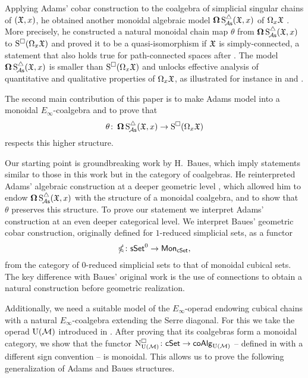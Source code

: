 Applying Adams' cobar construction to the coalgebra of simplicial singular chains of $(\mathfrak{X}, x)$, he obtained another monoidal algebraic model $\operatorname{\mathbf{\Omega}} \operatorname{S^{\triangle}_{\!{\mathcal{A}\mathsf{s}}}}(\mathfrak{X}, x)$ of $\Omega_x \mathfrak{X}$ \cite{adams1956cobar}.
More precisely, he constructed a natural monoidal chain map $\theta$ from $\operatorname{\mathbf{\Omega}} \operatorname{S^{\triangle}_{\!{\mathcal{A}\mathsf{s}}}}(\mathfrak{X}, x)$ to $\operatorname{S^{\square}}(\Omega_x \mathfrak{X})$ and proved it to be a quasi-isomorphism if $\mathfrak{X}$ is simply-connected, a statement that also holds true for path-connected spaces after \cite{rivera2018cubical}.
The model $\operatorname{\mathbf{\Omega}} \operatorname{S^{\triangle}_{\!{\mathcal{A}\mathsf{s}}}}(\mathfrak{X}, x)$ is smaller than $\operatorname{S^{\square}}(\Omega_x \mathfrak{X})$ and unlocks effective analysis of quantitative and qualitative properties of $\Omega_x \mathfrak{X}$, as illustrated for instance in \cite{chainalgebraloops} and \cite{adamscobarequivalence}.

The second main contribution of this paper is to make Adams model into a monoidal $E_\infty$-coalgebra and to prove that
\[
\theta \colon \operatorname{\mathbf{\Omega}} \operatorname{S^{\triangle}_{\!{\mathcal{A}\mathsf{s}}}}(\mathfrak{X}, x) \to \operatorname{S^{\square}}(\Omega_x \mathfrak{X})
\]
respects this higher structure.

Our starting point is groundbreaking work by H.~Baues, which imply statements similar to those in this work but in the category of coalgebras.
He reinterpreted Adams' algebraic construction at a deeper geometric level \cite{baues1998hopf}, which allowed him to endow $\operatorname{\mathbf{\Omega}} \operatorname{S^{\triangle}_{\!{\mathcal{A}\mathsf{s}}}}(\mathfrak{X}, x)$ with the structure of a monoidal coalgebra, and to show that $\theta$ preserves this structure.
To prove our statement we interpret Adams' construction at an even deeper categorical level.
We interpret Baues' geometric cobar construction, originally defined for $1$-reduced simplicial sets, as a functor
\begin{equation*}
	\operatorname{\mathbb{\Omega}} \colon \mathsf{sSet}^0 \to \mathsf{Mon}_{\mathsf{cSet}},
\end{equation*}
from the category of $0$-reduced simplicial sets to that of monoidal cubical sets.
The key difference with Baues' original work is the use of connections to obtain a natural construction before geometric realization.

Additionally, we need a suitable model of the $E_\infty$-operad endowing cubical chains with a natural $E_\infty$-coalgebra extending the Serre diagonal.
For this we take the operad ${\operatorname{U}(\mathcal{M})}$ introduced in \cite{medina2020prop1}.
After proving that its coalgebras form a monoidal category, we show that the functor $\operatorname{N^{\square}_{{\operatorname{U}(\mathcal{M})}}} \colon \mathsf{cSet} \to \mathsf{coAlg}_{\operatorname{U}(\mathcal{M})}$ -- defined in \cite{medina2022cube_einfty} with a different sign convention -- is monoidal.
This allows us to prove the following generalization of Adams and Baues structures.

